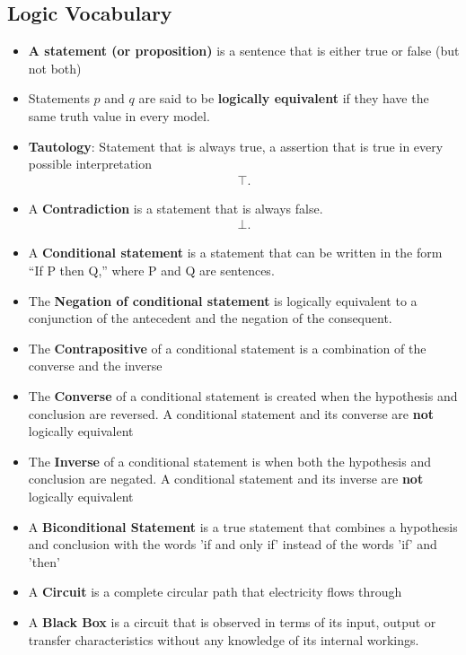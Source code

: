 \documentclass{report}
\begin{document}
    \subsection{Logic Vocabulary}
    \bigbreak \noindent 
    \begin{itemize}
      \item \textbf{A statement (or proposition)} is a sentence that is either true or false (but not both)
      \item Statements $p$ and $q$ are said to be \textbf{logically equivalent} if they have the same truth value in every model.
        \item \textbf{Tautology}: Statement that is always true, a assertion that is true in every possible interpretation
          \begin{align*}
            \top
          .\end{align*}
      \item A \textbf{Contradiction} is a statement that is always false.
        \begin{align*}
          \bot
        .\end{align*}
      \item A \textbf{Conditional statement} is a statement that can be written in the form “If P then Q,” where P and Q are sentences.
      \item The \textbf{Negation of conditional statement} is logically equivalent to a conjunction of the antecedent and the negation of the consequent.
      \item The \textbf{Contrapositive} of a conditional statement is a combination of the converse and the inverse
      \item The \textbf{Converse} of a conditional statement is created when the hypothesis and conclusion are reversed. A conditional statement and its converse are \textbf{not} logically equivalent
      \item  The \textbf{Inverse} of a conditional statement is when both the hypothesis and conclusion are negated. A conditional statement and its inverse are \textbf{not} logically equivalent
      \item A \textbf{Biconditional Statement} is a true statement that combines a hypothesis and conclusion with the words 'if and only if' instead of the words 'if' and 'then'
      \item A \textbf{Circuit} is a complete circular path that electricity flows through
      \item A \textbf{Black Box} is a circuit that is observed in terms of its input, output or transfer characteristics without any knowledge of its internal workings.

\end{itemize}
\end{document}
